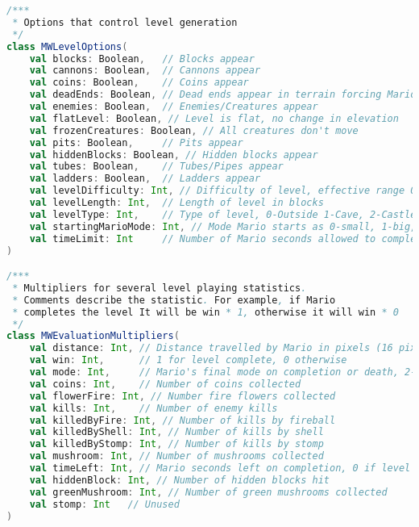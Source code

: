 \begin{appendices}
\begin{minipage}{0.9\linewidth}
\begin{lstlisting}[language=scala, basicstyle=\scriptsize\ttfamily, caption=Full field definitions for MWLevelOptions and MWEvaluationMultipliers described in Section \ref{subsec:paramclasses}]
/***
 * Options that control level generation
 */
class MWLevelOptions(
    val blocks: Boolean,   // Blocks appear
    val cannons: Boolean,  // Cannons appear
    val coins: Boolean,    // Coins appear
    val deadEnds: Boolean, // Dead ends appear in terrain forcing Mario to turn back
    val enemies: Boolean,  // Enemies/Creatures appear
    val flatLevel: Boolean, // Level is flat, no change in elevation
    val frozenCreatures: Boolean, // All creatures don't move
    val pits: Boolean,     // Pits appear
    val hiddenBlocks: Boolean, // Hidden blocks appear
    val tubes: Boolean,    // Tubes/Pipes appear
    val ladders: Boolean,  // Ladders appear
    val levelDifficulty: Int, // Difficulty of level, effective range 0-25, 0 easiest
    val levelLength: Int,  // Length of level in blocks
    val levelType: Int,    // Type of level, 0-Outside 1-Cave, 2-Castle
    val startingMarioMode: Int, // Mode Mario starts as 0-small, 1-big, 2-fire
    val timeLimit: Int     // Number of Mario seconds allowed to complete level
)

/***
 * Multipliers for several level playing statistics.
 * Comments describe the statistic. For example, if Mario
 * completes the level It will be win * 1, otherwise it will win * 0
 */
class MWEvaluationMultipliers(
    val distance: Int, // Distance travelled by Mario in pixels (16 pixels to a block)
    val win: Int,      // 1 for level complete, 0 otherwise
    val mode: Int,     // Mario's final mode on completion or death, 2-fire, 1-big, 0-small
    val coins: Int,    // Number of coins collected
    val flowerFire: Int, // Number fire flowers collected
    val kills: Int,    // Number of enemy kills
    val killedByFire: Int, // Number of kills by fireball
    val killedByShell: Int, // Number of kills by shell
    val killedByStomp: Int, // Number of kills by stomp
    val mushroom: Int, // Number of mushrooms collected
    val timeLeft: Int, // Mario seconds left on completion, 0 if level not completed
    val hiddenBlock: Int, // Number of hidden blocks hit
    val greenMushroom: Int, // Number of green mushrooms collected
    val stomp: Int   // Unused
)
\end{lstlisting}
\end{minipage}


\end{appendices}
